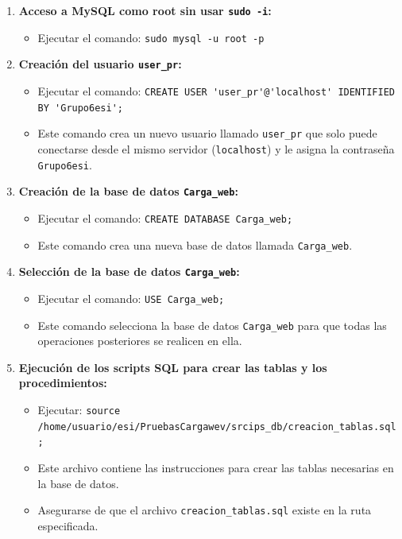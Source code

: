 \documentclass[10pt]{book}
\begin{document}
    \begin{enumerate}
        \item \textbf{Acceso a MySQL como root sin usar \texttt{sudo -i}:}
        \begin{itemize}
            \item Ejecutar el comando: \lstinline{sudo mysql -u root -p}
        \end{itemize}
    
        \item \textbf{Creación del usuario \texttt{user\_pr}:}
        \begin{itemize}
            \item Ejecutar el comando: \lstinline{CREATE USER 'user_pr'@'localhost' IDENTIFIED BY 'Grupo6esi';}
            \item Este comando crea un nuevo usuario llamado \texttt{user\_pr} que solo puede conectarse desde el mismo servidor (\texttt{localhost}) y le asigna la contraseña \texttt{Grupo6esi}.
        \end{itemize}
    
        \item \textbf{Creación de la base de datos \texttt{Carga\_web}:}
        \begin{itemize}
            \item Ejecutar el comando: \lstinline{CREATE DATABASE Carga_web;}
            \item Este comando crea una nueva base de datos llamada \texttt{Carga\_web}.
        \end{itemize}
    
        \item \textbf{Selección de la base de datos \texttt{Carga\_web}:}
        \begin{itemize}
            \item Ejecutar el comando: \lstinline{USE Carga_web;}
            \item Este comando selecciona la base de datos \texttt{Carga\_web} para que todas las operaciones posteriores se realicen en ella.
        \end{itemize}
    
        \item \textbf{Ejecución de los scripts SQL para crear las tablas y los procedimientos:}
        \begin{itemize}
            \item Ejecutar: \lstinline{source /home/usuario/esi/PruebasCargawev/srcips_db/creacion_tablas.sql;}
            \item Este archivo contiene las instrucciones para crear las tablas necesarias en la base de datos.
            \item Asegurarse de que el archivo \texttt{creacion\_tablas.sql} existe en la ruta especificada.
            

\end{itemize}
\end{enumerate}
\end{document}
